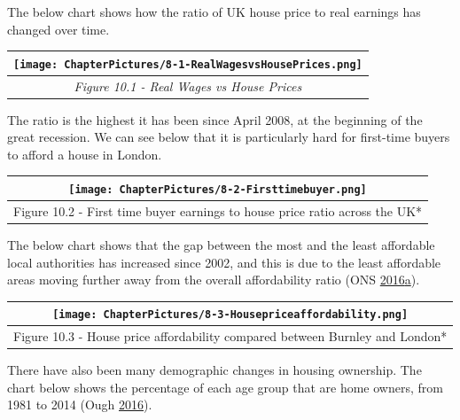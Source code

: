 \documentclass[]{tufte-handout}
\begin{document}
The below chart shows how the ratio of UK house price to real earnings
has changed over time.

\begin{longtable}[]{@{}c@{}}
\toprule
\texttt{[image: ChapterPictures/8-1-RealWagesvsHousePrices.png]}\tabularnewline
\midrule
\endhead
\emph{Figure 10.1 - Real Wages vs House Prices}\tabularnewline
\bottomrule
\end{longtable}

The ratio is the highest it has been since April 2008, at the beginning
of the great recession. We can see below that it is particularly hard
for first-time buyers to afford a house in London.

\begin{longtable}[]{@{}c@{}}
\toprule
\begin{minipage}[b]{0.97\columnwidth}\centering
\texttt{[image: ChapterPictures/8-2-Firsttimebuyer.png]}\strut
\end{minipage}\tabularnewline
\midrule
\endhead
\begin{minipage}[t]{0.97\columnwidth}\centering
Figure 10.2 - First time buyer earnings to house price ratio across the
UK*\strut
\end{minipage}\tabularnewline
\bottomrule
\end{longtable}

The below chart shows that the gap between the most and the least
affordable local authorities has increased since 2002, and this is due
to the least affordable areas moving further away from the overall
affordability ratio (ONS
\protect\hyperlink{ref-ONS2016a}{2016}\protect\hyperlink{ref-ONS2016a}{a}).

\begin{longtable}[]{@{}c@{}}
\toprule
\begin{minipage}[b]{0.97\columnwidth}\centering
\texttt{[image: ChapterPictures/8-3-Housepriceaffordability.png]}\strut
\end{minipage}\tabularnewline
\midrule
\endhead
\begin{minipage}[t]{0.97\columnwidth}\centering
Figure 10.3 - House price affordability compared between Burnley and
London*\strut
\end{minipage}\tabularnewline
\bottomrule
\end{longtable}

There have also been many demographic changes in housing ownership. The
chart below shows the percentage of each age group that are home owners,
from 1981 to 2014 (Ough \protect\hyperlink{ref-Ough2016}{2016}).
\end{document}
